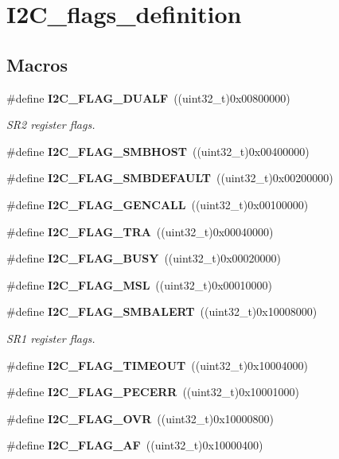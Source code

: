 \section{I2\+C\+\_\+flags\+\_\+definition}
\label{group__I2C__flags__definition}
\subsection*{Macros}
\begin{DoxyCompactItemize}
\item 
\#define \textbf{ I2\+C\+\_\+\+F\+L\+A\+G\+\_\+\+D\+U\+A\+LF}~((uint32\+\_\+t)0x00800000)
\begin{DoxyCompactList}\small\item\em S\+R2 register flags. \end{DoxyCompactList}\item 
\#define \textbf{ I2\+C\+\_\+\+F\+L\+A\+G\+\_\+\+S\+M\+B\+H\+O\+ST}~((uint32\+\_\+t)0x00400000)
\item 
\#define \textbf{ I2\+C\+\_\+\+F\+L\+A\+G\+\_\+\+S\+M\+B\+D\+E\+F\+A\+U\+LT}~((uint32\+\_\+t)0x00200000)
\item 
\#define \textbf{ I2\+C\+\_\+\+F\+L\+A\+G\+\_\+\+G\+E\+N\+C\+A\+LL}~((uint32\+\_\+t)0x00100000)
\item 
\#define \textbf{ I2\+C\+\_\+\+F\+L\+A\+G\+\_\+\+T\+RA}~((uint32\+\_\+t)0x00040000)
\item 
\#define \textbf{ I2\+C\+\_\+\+F\+L\+A\+G\+\_\+\+B\+U\+SY}~((uint32\+\_\+t)0x00020000)
\item 
\#define \textbf{ I2\+C\+\_\+\+F\+L\+A\+G\+\_\+\+M\+SL}~((uint32\+\_\+t)0x00010000)
\item 
\#define \textbf{ I2\+C\+\_\+\+F\+L\+A\+G\+\_\+\+S\+M\+B\+A\+L\+E\+RT}~((uint32\+\_\+t)0x10008000)
\begin{DoxyCompactList}\small\item\em S\+R1 register flags. \end{DoxyCompactList}\item 
\#define \textbf{ I2\+C\+\_\+\+F\+L\+A\+G\+\_\+\+T\+I\+M\+E\+O\+UT}~((uint32\+\_\+t)0x10004000)
\item 
\#define \textbf{ I2\+C\+\_\+\+F\+L\+A\+G\+\_\+\+P\+E\+C\+E\+RR}~((uint32\+\_\+t)0x10001000)
\item 
\#define \textbf{ I2\+C\+\_\+\+F\+L\+A\+G\+\_\+\+O\+VR}~((uint32\+\_\+t)0x10000800)
\item 
\#define \textbf{ I2\+C\+\_\+\+F\+L\+A\+G\+\_\+\+AF}~((uint32\+\_\+t)0x10000400)

\end{DoxyCompactItemize}
